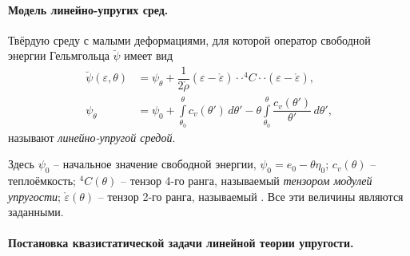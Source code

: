 
\paragraph{Модель линейно-упругих сред.}
\begin{definition}
  Твёрдую среду с малыми деформациями, для которой оператор свободной энергии Гельмгольца
  $\breve{\psi}$ имеет вид
  \begin{align*}
    \breve{\psi}(\varepsilon, \theta) &= \psi_\theta + \dfrac{1}{2\mathring{\rho}} (\varepsilon - \mathring{\varepsilon}) \cdot\cdot {}^4 C \cdot\cdot (\varepsilon - \mathring{\varepsilon}), \\
    \psi_\theta &= \psi_0 + \int\limits_{\theta_0}^\theta c_v(\theta') \, d\theta' - \theta \int\limits_{\theta_0}^\theta \dfrac{c_v(\theta')}{\theta'} \, d\theta',
  \end{align*}
  называют \emph{линейно-упругой средой}.

  Здесь $\psi_0$ -- начальное значение свободной энергии, $\psi_0 = e_0 - \theta \eta_0$;
  $c_v(\theta)$ -- теплоёмкость;
  ${}^4 C (\theta)$ -- тензор 4-го ранга, называемый \emph{тензором модулей упругости};
  $\mathring{\varepsilon}(\theta)$ -- тензор 2-го ранга, называемый .
  Все эти величины являются заданными.
\end{definition}


\paragraph{Постановка квазистатической задачи линейной теории упругости.}

